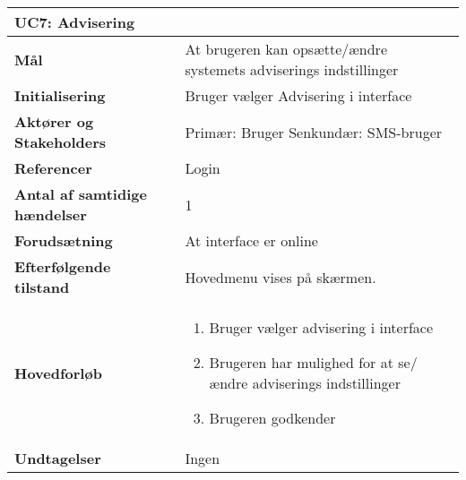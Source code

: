 \begin{table}[H] \centering
\begin{tabular}{|p{6cm}|p{8cm}|}
	\hline
\multicolumn{2}{|l|}{\textbf{UC7: Advisering}} \\\hline
\textbf{Mål}								
&At brugeren kan opsætte/ændre systemets adviserings indstillinger
 \\\hline
\textbf{Initialisering}					
&Bruger vælger Advisering i interface
 \\\hline
\textbf{Aktører og Stakeholders}			
&Primær: Bruger Senkundær: SMS-bruger
 \\\hline
\textbf{Referencer}						
&Login
 \\\hline
\textbf{Antal af samtidige hændelser}	
&1
 \\\hline
\textbf{Forudsætning}					
&At interface er online
 \\\hline
\textbf{Efterfølgende tilstand}			
&Hovedmenu vises på skærmen.
 \\\hline
\textbf{Hovedforløb}						
& 
\begin{enumerate}

\item Bruger vælger advisering i interface

\item Brugeren har mulighed for at se/ændre adviserings indstillinger

\item Brugeren godkender
 
\end{enumerate}
 \\\hline
 
\textbf{Undtagelser} &Ingen \\\hline
	\end{tabular}
	\label{UC7} 
\end{table}